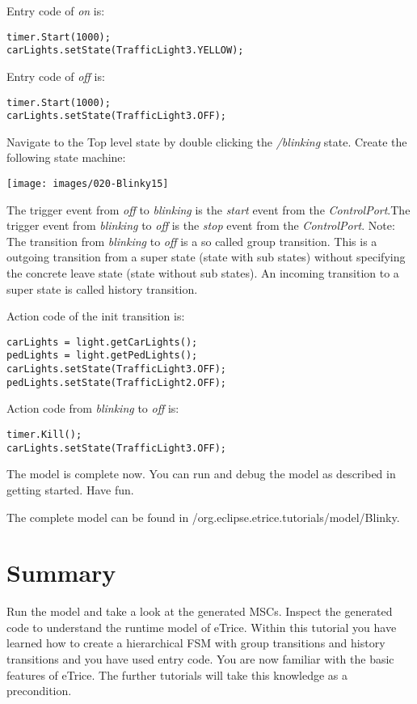 Entry code of \textit{on} is:

\begin{verbatim}
timer.Start(1000);
carLights.setState(TrafficLight3.YELLOW); 
\end{verbatim}

 
Entry code  of \textit{off} is:

\begin{verbatim}
timer.Start(1000);
carLights.setState(TrafficLight3.OFF);
\end{verbatim}

Navigate to the Top level state by double clicking the \textit{/blinking} state. Create the following state machine:

\texttt{[image: images/020-Blinky15]}

The trigger event from \textit{off} to \textit{blinking} is the \textit{start} event from the \textit{ControlPort}.The trigger event from \textit{blinking} to \textit{off} is the \textit{stop} event from the \textit{ControlPort}.
Note: The transition from \textit{blinking} to \textit{off} is a so called group transition. This is a outgoing transition from a super state (state with sub states) without specifying the concrete leave state (state without sub states). An incoming transition to a super state is called history transition.   

Action code of the init transition is:

\begin{verbatim}
carLights = light.getCarLights();
pedLights = light.getPedLights();
carLights.setState(TrafficLight3.OFF);
pedLights.setState(TrafficLight2.OFF);
\end{verbatim}

Action code from \textit{blinking} to \textit{off} is:

\begin{verbatim}
timer.Kill();
carLights.setState(TrafficLight3.OFF); 
\end{verbatim}

The model is complete now. You can run and debug the model as described in getting started. Have fun.

The complete model can be found in /org.eclipse.etrice.tutorials/model/Blinky.

\section{Summary}

Run the model and take a look at the generated MSCs. Inspect the generated code to understand the runtime model of eTrice. Within this tutorial you have learned how to create a hierarchical FSM with group transitions and history transitions and you have used entry code. You are now familiar with the basic features of eTrice. The further tutorials will take this knowledge as a precondition.
